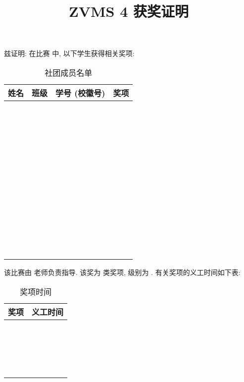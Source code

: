 \documentclass{article}
\title{ZVMS 4 获奖证明}
\date{}
\begin{document}
\maketitle

兹证明: 在比赛 \underline{\hspace{8em}} 中, 以下学生获得相关奖项:

\begin{table}[H]
  \centering
  \begin{tabular}{|c|c|c|c|}
    \hline
    \textbf{\hspace{2em}姓名\hspace{2em}} & \textbf{\hspace{2em}班级\hspace{2em}} & \textbf{\hspace{2em}学号 (校徽号)\hspace{2em}} & \textbf{\hspace{2em}奖项\hspace{2em}} \\
    \hline
    ~&~&~&~\\\hline~&~&~&~\\\hline~&~&~&~\\\hline~&~&~&~\\\hline~&~&~&~\\\hline~&~&~&~\\\hline~&~&~&~\\\hline~&~&~&~\\\hline~&~&~&~\\\hline~&~&~&~\\\hline~&~&~&~\\\hline
  \end{tabular}
  \caption{社团成员名单}
\end{table}

该比赛由 \underline{\hspace{4em}} 老师负责指导. 该奖为 \underline{\hspace{3em}} 类奖项, 级别为 \underline{\hspace{3em}}. 有关奖项的义工时间如下表:

\begin{table}[H]
  \centering
  \begin{tabular}{|c|c|}
    \hline
    \textbf{\hspace{2em}奖项\hspace{2em}} & \textbf{\hspace{2em}义工时间\hspace{2em}} \\
    \hline
    ~&~\\\hline~&~\\\hline~&~\\\hline~&~\\\hline
  \end{tabular}
  \caption{奖项时间}
\end{table}
\end{document}
